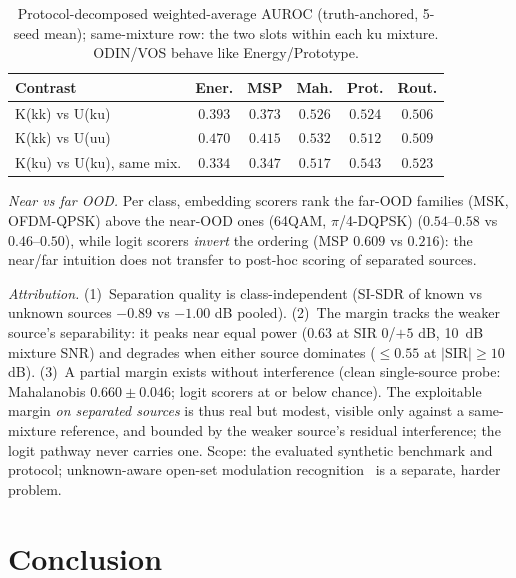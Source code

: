 \documentclass[journal,letterpaper]{IEEEtran}
\begin{document}
\begin{table}[!t]
\centering
\caption{Protocol-decomposed weighted-average AUROC (truth-anchored,
5-seed mean); same-mixture row: the two slots within each ku mixture.
ODIN/VOS behave like Energy/Prototype.}
\label{tab:protocol}
\scriptsize\setlength{\tabcolsep}{3.5pt}
\begin{tabular}{lccccc}
\toprule
Contrast & Ener. & MSP & Mah. & Prot. & Rout. \\
\midrule
K(kk) vs U(ku)            & $0.393$ & $0.373$ & $0.526$ & $0.524$ & $0.506$ \\
K(kk) vs U(uu)            & $0.470$ & $0.415$ & $0.532$ & $0.512$ & $0.509$ \\
K(ku) vs U(ku), same mix. & $0.334$ & $0.347$ & $0.517$ & $0.543$ & $0.523$ \\
\bottomrule
\end{tabular}
\end{table}

\emph{Near vs far OOD.} Per class, embedding scorers rank the far-OOD
families (MSK, OFDM-QPSK) above the near-OOD ones (64QAM,
$\pi$/4-DQPSK) ($0.54$--$0.58$ vs $0.46$--$0.50$), while logit scorers
\emph{invert} the ordering (MSP $0.609$ vs $0.216$): the near/far
intuition does not transfer to post-hoc scoring of separated sources.

\emph{Attribution.} (1)~Separation quality is class-independent
(SI-SDR of known vs unknown sources $-0.89$ vs $-1.00$ dB pooled).
(2)~The margin tracks the weaker source's separability: it peaks near
equal power ($0.63$ at SIR $0$/$+5$ dB, \SI{10}{dB} mixture SNR) and
degrades when either source dominates ($\leq 0.55$ at $|$SIR$| \geq
10$ dB). (3)~A partial margin exists without interference (clean
single-source probe: Mahalanobis $0.660 \pm 0.046$; logit scorers at or
below chance). The exploitable margin \emph{on separated sources} is
thus real but modest, visible only against a same-mixture reference,
and bounded by the weaker source's residual interference; the logit
pathway never carries one. Scope: the evaluated synthetic benchmark and
protocol; unknown-aware open-set modulation
recognition~\cite{li2023expert} is a separate, harder problem.

\section{Conclusion}
\label{sec:concl}
\end{document}
